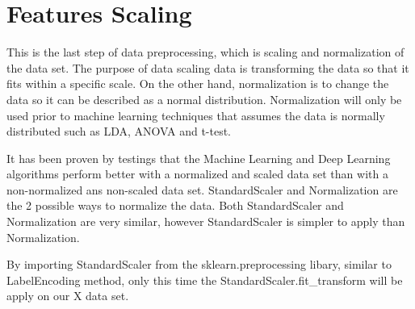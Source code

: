 \section{Features Scaling} %
\label{sec:feature_scaling}
\hspace{10px} This is the last step of data preprocessing, which is scaling and normalization of the data set. The purpose of data scaling data is transforming the data so that it fits within a specific scale. On the other hand, normalization is to change the data so it can be described as a normal distribution. Normalization will only be used prior to machine learning techniques that assumes the data is normally distributed such as LDA, ANOVA and t-test.

It has been proven by testings that the Machine Learning and Deep Learning algorithms perform better with a normalized and scaled data set than with a non-normalized ans non-scaled data set. StandardScaler and Normalization are the 2 possible ways to normalize the data. Both StandardScaler and Normalization are very similar, however StandardScaler is simpler to apply than Normalization.

By importing StandardScaler from the  sklearn.preprocessing libary, similar to LabelEncoding method, only this time the StandardScaler.fit\_transform will be apply on our X data set.



